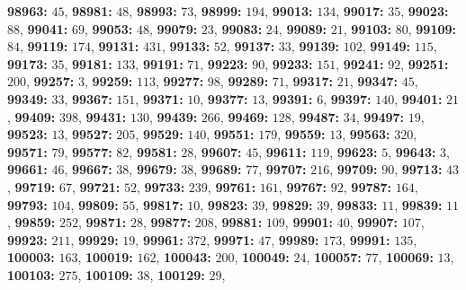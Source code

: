 \textsf{\bfseries 98963:} $45$, \textsf{\bfseries 98981:} $48$, \textsf{\bfseries 98993:} $73$, \textsf{\bfseries 98999:} $194$, \textsf{\bfseries 99013:} $134$, \textsf{\bfseries 99017:} $35$, \textsf{\bfseries 99023:} $88$, \textsf{\bfseries 99041:} $69$, \textsf{\bfseries 99053:} $48$, \textsf{\bfseries 99079:} $23$, \textsf{\bfseries 99083:} $24$, \textsf{\bfseries 99089:} $21$, \textsf{\bfseries 99103:} $80$, \textsf{\bfseries 99109:} $84$, \textsf{\bfseries 99119:} $174$, \textsf{\bfseries 99131:} $431$, \textsf{\bfseries 99133:} $52$, \textsf{\bfseries 99137:} $33$, \textsf{\bfseries 99139:} $102$, \textsf{\bfseries 99149:} $115$, \textsf{\bfseries 99173:} $35$, \textsf{\bfseries 99181:} $133$, \textsf{\bfseries 99191:} $71$, \textsf{\bfseries 99223:} $90$, \textsf{\bfseries 99233:} $151$, \textsf{\bfseries 99241:} $92$, \textsf{\bfseries 99251:} $200$, \textsf{\bfseries 99257:} $3$, \textsf{\bfseries 99259:} $113$, \textsf{\bfseries 99277:} $98$, \textsf{\bfseries 99289:} $71$, \textsf{\bfseries 99317:} $21$, \textsf{\bfseries 99347:} $45$, \textsf{\bfseries 99349:} $33$, \textsf{\bfseries 99367:} $151$, \textsf{\bfseries 99371:} $10$, \textsf{\bfseries 99377:} $13$, \textsf{\bfseries 99391:} $6$, \textsf{\bfseries 99397:} $140$, \textsf{\bfseries 99401:} $21$, \textsf{\bfseries 99409:} $398$, \textsf{\bfseries 99431:} $130$, \textsf{\bfseries 99439:} $266$, \textsf{\bfseries 99469:} $128$, \textsf{\bfseries 99487:} $34$, \textsf{\bfseries 99497:} $19$, \textsf{\bfseries 99523:} $13$, \textsf{\bfseries 99527:} $205$, \textsf{\bfseries 99529:} $140$, \textsf{\bfseries 99551:} $179$, \textsf{\bfseries 99559:} $13$, \textsf{\bfseries 99563:} $320$, \textsf{\bfseries 99571:} $79$, \textsf{\bfseries 99577:} $82$, \textsf{\bfseries 99581:} $28$, \textsf{\bfseries 99607:} $45$, \textsf{\bfseries 99611:} $119$, \textsf{\bfseries 99623:} $5$, \textsf{\bfseries 99643:} $3$, \textsf{\bfseries 99661:} $46$, \textsf{\bfseries 99667:} $38$, \textsf{\bfseries 99679:} $38$, \textsf{\bfseries 99689:} $77$, \textsf{\bfseries 99707:} $216$, \textsf{\bfseries 99709:} $90$, \textsf{\bfseries 99713:} $43$, \textsf{\bfseries 99719:} $67$, \textsf{\bfseries 99721:} $52$, \textsf{\bfseries 99733:} $239$, \textsf{\bfseries 99761:} $161$, \textsf{\bfseries 99767:} $92$, \textsf{\bfseries 99787:} $164$, \textsf{\bfseries 99793:} $104$, \textsf{\bfseries 99809:} $55$, \textsf{\bfseries 99817:} $10$, \textsf{\bfseries 99823:} $39$, \textsf{\bfseries 99829:} $39$, \textsf{\bfseries 99833:} $11$, \textsf{\bfseries 99839:} $11$, \textsf{\bfseries 99859:} $252$, \textsf{\bfseries 99871:} $28$, \textsf{\bfseries 99877:} $208$, \textsf{\bfseries 99881:} $109$, \textsf{\bfseries 99901:} $40$, \textsf{\bfseries 99907:} $107$, \textsf{\bfseries 99923:} $211$, \textsf{\bfseries 99929:} $19$, \textsf{\bfseries 99961:} $372$, \textsf{\bfseries 99971:} $47$, \textsf{\bfseries 99989:} $173$, \textsf{\bfseries 99991:} $135$, \textsf{\bfseries 100003:} $163$, \textsf{\bfseries 100019:} $162$, \textsf{\bfseries 100043:} $200$, \textsf{\bfseries 100049:} $24$, \textsf{\bfseries 100057:} $77$, \textsf{\bfseries 100069:} $13$, \textsf{\bfseries 100103:} $275$, \textsf{\bfseries 100109:} $38$, \textsf{\bfseries 100129:} $29$, 
